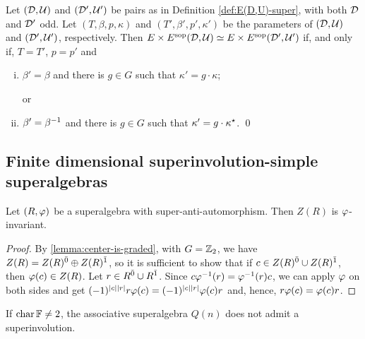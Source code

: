\begin{thm}\label{thm:iso-D-odd-ExEsop}
    Let $(\mathcal{D}, \mathcal U)$ and $(\mathcal{D}', \mathcal U')$ be pairs as in Definition \ref{def:E(D,U)-super}, with both $\mathcal{D}$ and $\mathcal{D}'$ odd. 
    Let $(T, \beta, p, \kappa)$ and $(T', \beta', p', \kappa')$ be the parameters of $(\mathcal{D}, \mathcal U)$ and $(\mathcal{D}', \mathcal U')$, respectively. 
	Then $E\times E^{\mathrm{sop}}(\mathcal{D}, \mathcal U) \simeq E\times E^{\mathrm{sop}}(\mathcal{D}', \mathcal U')$ if, and only if, $T=T'$, $p = p'$ and
	\begin{enumerate}[(i)]
	    \item $\beta'=\beta$ and there is $g\in G$ such that $\kappa' = g \cdot \kappa$;
	    
	    or
	    \item $\beta'=\beta^{-1}$ and there is $g\in G$ such that $\kappa' = g \cdot \kappa^\star$. \qed
	\end{enumerate}
\end{thm}

\subsection{Finite dimensional superinvolution-simple superalgebras}



\begin{lemma}
	Let $(R, \varphi)$ be a superalgebra with super-anti-automorphism.
	Then $Z(R)$ is $\varphi$-invariant.
\end{lemma}

\begin{proof}
	By \cref{lemma:center-is-graded}, with $G = \mathbb{Z}_2$, we have $Z(R) = Z(R)^{\bar0} \oplus Z(R)^{\bar1}$, so it is sufficient to show that if $c \in Z(R)^{\bar0} \cup Z(R)^{\bar1}$, then $\varphi(c) \in Z(R)$. 
	Let $r \in R^{\bar0} \cup R^{\bar1}$.
	Since $c\varphi^{-1} (r) = \varphi^{-1} (r)c$, we can apply $\varphi$ on both sides and get $(-1)^{|c||r|} r \varphi(c) = (-1)^{|c||r|} \varphi(c) r$ and, hence, $r \varphi(c) = \varphi(c) r$.
\end{proof}

\begin{cor}\label{cor:Q-no-spuerinv-center}
	If $\operatorname{char} \mathbb{F} \neq 2$, the associative superalgebra $Q(n)$ does not admit a superinvolution.
\end{cor}

